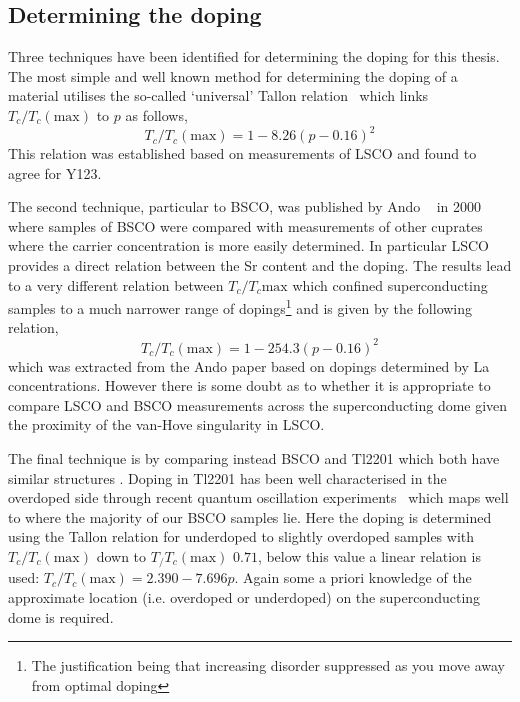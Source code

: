 \subsection{Determining the doping}

Three techniques have been identified for determining the doping for this thesis. The most simple and well known method for determining the doping of a material utilises the so-called `universal' Tallon relation~\cite{Presland1991} which links $T_c/T_c(\textrm{max})$ to $p$ as follows,
\begin{equation}
\label{Eqn:ExpH:TallonRelation}
T_c/T_c(\textrm{max}) = 1 - 8.26 (p - 0.16)^2
\end{equation}
This relation was established based on measurements of \ac{LSCO} and found to agree for \ac{Y123}.

The second technique, particular to \ac{BSCO}, was published by Ando \etal~\cite{Ando2000} in 2000 where samples of \ac{BSCO} were compared with measurements of other cuprates where the carrier concentration is more easily determined. In particular \acf{LSCO} provides a direct relation between the Sr content and the doping. The results lead to a very different relation between $T_c/T_c{\textrm{max}}$ which confined superconducting samples to a much narrower range of dopings\footnote{The justification being that increasing disorder suppressed \Tc as you move away from optimal doping} and is given by the following relation,
\begin{equation}
\label{Eqn:Exp:AndoRelation}
T_c/T_c(\textrm{max}) = 1 - 254.3 (p - 0.16)^2
\end{equation}
which was extracted from the Ando paper based on dopings determined by La concentrations. However there is some doubt as to whether it is appropriate to compare \ac{LSCO} and \ac{BSCO} measurements across the superconducting dome given the proximity of the van-Hove singularity in \ac{LSCO}.

The final technique is by comparing instead \ac{BSCO} and \ac{Tl2201} which both have similar structures . Doping in \ac{Tl2201} has been well characterised in the overdoped side through recent quantum oscillation experiments~\cite{Bangura2010} which maps well to where the majority of our \ac{BSCO} samples lie. Here the doping is determined using the Tallon relation for underdoped to slightly overdoped samples with $T_c/T_c(\textrm{max})$ down to $T_/T_c(\textrm{max})$ $0.71$, below this value a linear relation is used: $T_c/T_c(\textrm{max}) = 2.390 - 7.696p$. Again some a priori knowledge of the approximate location (i.e. overdoped or underdoped) on the superconducting dome is required.

